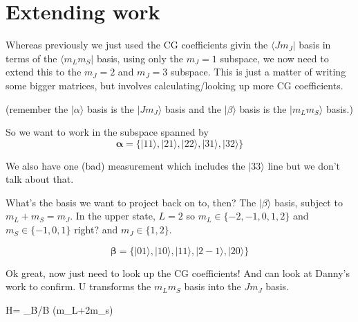 \documentclass{article}
\newcommand{\bra}[1]{\langle#1|}
\newcommand{\ket}[1]{|#1\rangle}
\begin{document}
\section{Extending work}

Whereas previously we just used the CG coefficients givin the $\bra{Jm_J}$ basis in terms of the $\bra{m_L m_S}$ basis, using only the $m_J=1$ subspace, we now need to extend this to the $m_J=2$ and $m_J=3$ subspace. This is just a matter of writing some bigger matrices, but involves calculating/looking up more CG coefficients.

(remember the $\ket{\alpha}$ basis is the $\ket{Jm_J}$ basis and the $\ket{\beta}$ basis is the $\ket{m_Lm_S}$ basis.)

So we want to work in the subspace spanned by 
\begin{equation}
	\bm{\alpha} = \{\ket{11},\ket{21},\ket{22},\ket{31},\ket{32}\}
\end{equation}

We also have one (bad) measurement which includes the $\ket{33}$ line but we don't talk about that.

What's the basis we want to project back on to, then? The $\ket{\beta}$ basis, subject to $m_L+m_S=m_J$.
In the upper state, $L=2$ so $m_L\in\{-2,-1,0,1,2\}$ and $m_S\in\{-1,0,1\}$ right? 
and $m_J\in\{1,2\}$.

\begin{equation}
	\bm{\beta} = \{\ket{01},\ket{10},\ket{11},\ket{2-1},\ket{20}\}
\end{equation}

Ok great, now just need to look up the CG coefficients! And can look at Danny's work to confirm. U transforms the $m_L m_S$ basis into the $J m_J$ basis. 





H\alpha = \mu_B/\hbar B (m_L+2m_s)
\end{document}
